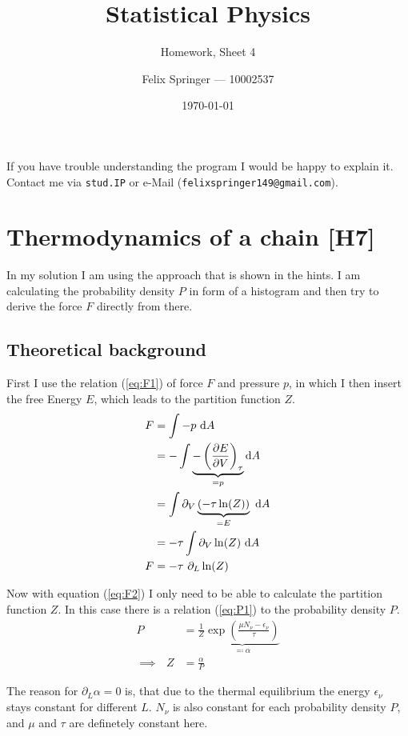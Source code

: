 \documentclass[a4paper,12pt]{scrartcl}
\title{Statistical Physics}
\subtitle{Homework, Sheet 4}
\author{Felix Springer --- 10002537}
\date{\today}
\begin{document}
\maketitle

If you have trouble understanding the program I would be happy to explain it.
Contact me via \texttt{stud.IP} or e-Mail (\texttt{felixspringer149@gmail.com}).

\section{Thermodynamics of a chain [H7]}
In my solution I am using the approach that is shown in the hints.
I am calculating the probability density $P$ in form of a histogram and then try to derive the force $F$ directly from there.

\subsection{Theoretical background}
First I use the relation (\ref{eq:F1}) of force $F$ and pressure $p$, in which I then insert the free Energy $E$, which leads to the partition function $Z$.
\begin{align}
	F &= \int - p \text{ d}A \label{eq:F1} \\
	&= - \int \underbrace{- \left( \frac{\partial E}{\partial V} \right)_{\tau}}_{= p} \text{d}A \notag \\
	&= \int \partial_V \underbrace{(- \tau \ln(Z))}_{= E} \text{ d}A \notag \\
	&= - \tau \int \partial_V \ln(Z) \text{ d}A \notag \\
	F &= - \tau \text{ } \partial_L \ln(Z) \label{eq:F2}
\end{align}

Now with equation (\ref{eq:F2}) I only need to be able to calculate the partition function $Z$.
In this case there is a relation (\ref{eq:P1}) to the probability density $P$.
\begin{align}
	P &= \frac{1}{Z} \underbrace{\exp \left( {\frac{\mu N_\nu - \epsilon_\nu}{\tau}} \right)}_{\eqqcolon \alpha} \label{eq:P1} \\
	\implies \text{ } Z &= \frac{\alpha}{P} \label{eq:Z1}
\end{align}

The reason for $\partial_L \alpha = 0$ is, that due to the thermal equilibrium the energy $\epsilon_\nu$ stays constant for different $L$. $N_\nu$ is also constant for each probability density $P$, and $\mu$ and $\tau$ are definetely constant here.
\end{document}
